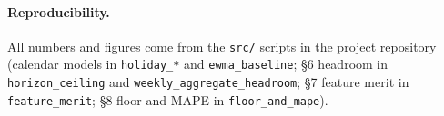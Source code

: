 \documentclass[11pt]{article}
\begin{document}
\paragraph{Reproducibility.} All numbers and figures come from the
\texttt{src/} scripts in the project repository (calendar models in
\texttt{holiday\_*} and \texttt{ewma\_baseline}; \S6 headroom in
\texttt{horizon\_ceiling} and \texttt{weekly\_aggregate\_headroom}; \S7 feature
merit in \texttt{feature\_merit}; \S8 floor and MAPE in \texttt{floor\_and\_mape}).
\end{document}
